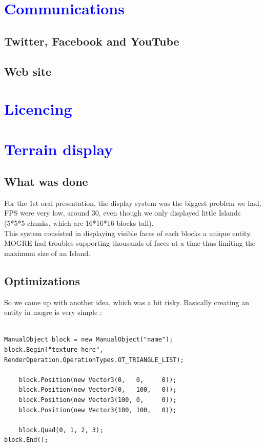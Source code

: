 \documentclass[article]{report} %
\begin{document}
  		\chapter{\textcolor{blue}{Communications}}
			\section{Twitter, Facebook and YouTube }
				
			\section{Web site}
				
		\chapter{\textcolor{blue}{Licencing}}

		\chapter{\textcolor{blue}{Terrain display}}
			\section{What was done}
				For the 1st oral presentation, the display system was the biggest problem we had, FPS were very low, around 30, even though we only displayed little Islands (5*5*5 chunks, which are 16*16*16 blocks tall).\\

This system consisted in displaying visible faces of each blocks a unique entity. MOGRE had troubles supporting thousands of faces at a time thus limiting the maximum size of an Island.

			\section{Optimizations}
				So we came up with another idea, which was a bit risky. Basically creating an entity in mogre is very simple :\\
\begin{lstlisting}

ManualObject block = new ManualObject("name");
block.Begin("texture here", RenderOperation.OperationTypes.OT_TRIANGLE_LIST);

	block.Position(new Vector3(0,   0,     0));
	block.Position(new Vector3(0,   100,   0));
	block.Position(new Vector3(100, 0,     0));
	block.Position(new Vector3(100, 100,   0));

	block.Quad(0, 1, 2, 3);
block.End();

\end{lstlisting}
\end{document}
